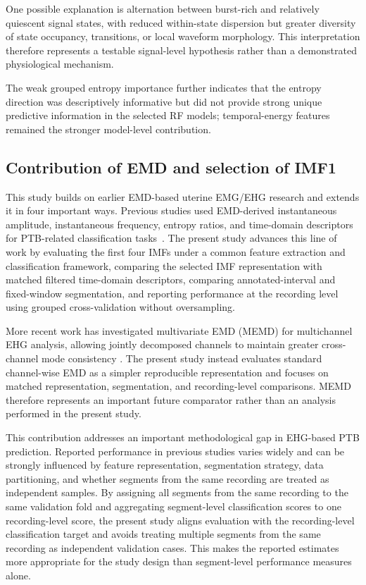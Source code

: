 \documentclass[10pt,letterpaper]{article}
\begin{document}
One possible explanation is alternation between burst-rich and relatively quiescent signal states, with reduced within-state dispersion but greater diversity of state occupancy, transitions, or local waveform morphology. This interpretation therefore represents a testable signal-level hypothesis rather than a demonstrated physiological mechanism.

The weak grouped entropy importance further indicates that the entropy direction was descriptively informative but did not provide strong unique predictive information in the selected RF models; temporal-energy features remained the stronger model-level contribution.

\subsection*{Contribution of EMD and selection of IMF1}
This study builds on earlier EMD-based uterine EMG/EHG research and extends it in four important ways. Previous studies used EMD-derived instantaneous amplitude, instantaneous frequency, entropy ratios, and time-domain descriptors for PTB-related classification tasks~\cite{Ren2015EMD,janjarasjitt2021preterm,janjarasjitt2022comparison}. The present study advances this line of work by evaluating the first four IMFs under a common feature extraction and classification framework, comparing the selected IMF representation with matched filtered time-domain descriptors, comparing annotated-interval and fixed-window segmentation, and reporting performance at the recording level using grouped cross-validation without oversampling.

More recent work has investigated multivariate EMD (MEMD) for multichannel EHG analysis, allowing jointly decomposed channels to maintain greater cross-channel mode consistency \cite{Cui2025MEMD}. The present study instead evaluates standard channel-wise EMD as a simpler reproducible representation and focuses on matched representation, segmentation, and recording-level comparisons. MEMD therefore represents an important future comparator rather than an analysis performed in the present study.

This contribution addresses an important methodological gap in EHG-based PTB prediction. Reported performance in previous studies varies widely and can be strongly influenced by feature representation, segmentation strategy, data partitioning, and whether segments from the same recording are treated as independent samples. By assigning all segments from the same recording to the same validation fold and aggregating segment-level classification scores to one recording-level score, the present study aligns evaluation with the recording-level classification target and avoids treating multiple segments from the same recording as independent validation cases. This makes the reported estimates more appropriate for the study design than segment-level performance measures alone.
\end{document}

